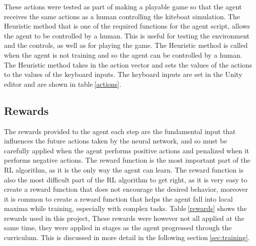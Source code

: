 These actions were tested as part of making a playable game so that the agent receives the same actions as a human controlling the kiteboat simulation. The Heuristic method that is one of the required functions for the agent script, allows the agent to be controlled by a human. This is useful for testing the environment and the controls, as well as for playing the game. The Heuristic method is called when the agent is not training and so the agent can be controlled by a human. The Heuristic method takes in the action vector and sets the values of the actions to the values of the keyboard inputs. The keyboard inputs are set in the Unity editor and are shown in table$~$\ref{actions}. 

\begin{table}[h]
    \centering
    \caption{Actions}\label{actions}
\end{table}


\subsection{Rewards}

The rewards provided to the agent each step are the fundamental input that influences the future actions taken by the neural network, and so must be carefully applied when the agent performs positive actions and penalized when it performs negative actions. The reward function is the most important part of the RL algorithm, as it is the only way the agent can learn. The reward function is also the most difficult part of the RL algorithm to get right, as it is very easy to create a reward function that does not encourage the desired behavior, moreover it is common to create a reward function that helps the agent fall into local maxima while training, especially with complex tasks. Table$~$\ref{rewards} shows the rewards used in this project, These rewards were however not all applied at the same time, they were applied in stages as the agent progressed through the curriculum. This is discussed in more detail in the following section$~$\ref{sec:training}.


